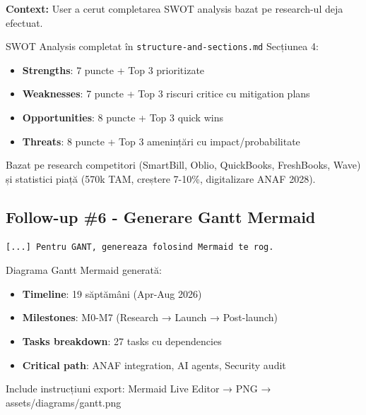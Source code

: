 \documentclass[11pt,a4paper]{article}
\begin{document}
\textbf{Context:} User a cerut completarea SWOT analysis bazat pe research-ul deja efectuat.

\begin{tcolorbox}[colback=outputbackground,colframe=green!75!black,title=Output Generat]
SWOT Analysis completat în \texttt{structure-and-sections.md} Secțiunea 4:
\begin{itemize}[leftmargin=*]
    \item \textbf{Strengths}: 7 puncte + Top 3 prioritizate
    \item \textbf{Weaknesses}: 7 puncte + Top 3 riscuri critice cu mitigation plans
    \item \textbf{Opportunities}: 8 puncte + Top 3 quick wins
    \item \textbf{Threats}: 8 puncte + Top 3 amenințări cu impact/probabilitate
\end{itemize}

Bazat pe research competitori (SmartBill, Oblio, QuickBooks, FreshBooks, Wave) și statistici piață (570k TAM, creștere 7-10\%, digitalizare ANAF 2028).
\end{tcolorbox}

\subsection{Follow-up \#6 - Generare Gantt Mermaid}

\begin{tcolorbox}[colback=promptbackground,colframe=blue!75!black,title=Prompt Input]
\begin{verbatim}
[...] Pentru GANT, genereaza folosind Mermaid te rog.
\end{verbatim}
\end{tcolorbox}

\begin{tcolorbox}[colback=outputbackground,colframe=green!75!black,title=Output Generat]
Diagrama Gantt Mermaid generată:
\begin{itemize}[leftmargin=*]
    \item \textbf{Timeline}: 19 săptămâni (Apr-Aug 2026)
    \item \textbf{Milestones}: M0-M7 (Research → Launch → Post-launch)
    \item \textbf{Tasks breakdown}: 27 tasks cu dependencies
    \item \textbf{Critical path}: ANAF integration, AI agents, Security audit
\end{itemize}

Include instrucțiuni export: Mermaid Live Editor → PNG → assets/diagrams/gantt.png
\end{tcolorbox}
\end{document}
